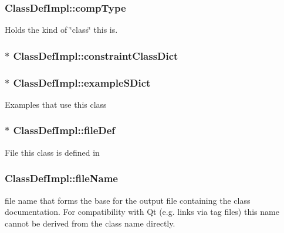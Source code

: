 \subsubsection[{comp\+Type}]{ Class\+Def\+Impl\+::comp\+Type}\label{class_class_def_impl_af8b4e7fb963b0feff4a8009a358bd90b}
Holds the kind of \char`\"{}class\char`\"{} this is. \hypertarget{class_class_def_impl_ac07bb35d01da6f43d0e39af700ea55db}{}
\subsubsection[{constraint\+Class\+Dict}]{$\ast$ Class\+Def\+Impl\+::constraint\+Class\+Dict}\label{class_class_def_impl_ac07bb35d01da6f43d0e39af700ea55db}
\hypertarget{class_class_def_impl_a256b7b66998ac4aaf0495a4133fa16a3}{}
\subsubsection[{example\+S\+Dict}]{$\ast$ Class\+Def\+Impl\+::example\+S\+Dict}\label{class_class_def_impl_a256b7b66998ac4aaf0495a4133fa16a3}
Examples that use this class \hypertarget{class_class_def_impl_ac2c8c9c6cc2cea9076ad649149505f1a}{}
\subsubsection[{file\+Def}]{$\ast$ Class\+Def\+Impl\+::file\+Def}\label{class_class_def_impl_ac2c8c9c6cc2cea9076ad649149505f1a}
File this class is defined in \hypertarget{class_class_def_impl_af4852c18aa3acaa24dd3056896a51605}{}
\subsubsection[{file\+Name}]{ Class\+Def\+Impl\+::file\+Name}\label{class_class_def_impl_af4852c18aa3acaa24dd3056896a51605}
file name that forms the base for the output file containing the class documentation. For compatibility with Qt (e.\+g. links via tag files) this name cannot be derived from the class name directly. \hypertarget{class_class_def_impl_a4d615eed35e81984df99b64bd9334e55}{}
